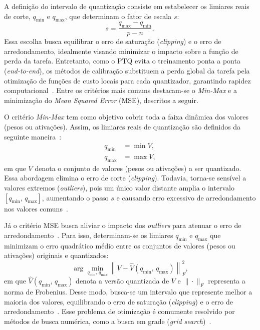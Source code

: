 A definição do intervalo de quantização consiste em estabelecer os limiares reais de corte, $q_{\min}$ e $q_{\max}$, que determinam o fator de escala $s$:
\begin{equation}
s = \frac{q_{\max} - q_{\min}}{p - n},
\label{eq:escala_s}
\end{equation}
Essa escolha busca equilibrar o erro de saturação (\textit{clipping}) e o erro de arredondamento, idealmente visando minimizar o impacto sobre a função de perda da tarefa. Entretanto, 
como o PTQ evita o treinamento ponta a ponta (\textit{end-to-end}), os métodos de calibração substituem a perda global da tarefa pela otimização de funções de custo locais para cada quantizador,      
garantindo rapidez computacional~\cite{nagel2021}. Entre os critérios mais comuns destacam-se o \textit{Min-Max} e a minimização do \textit{Mean Squared Error} (MSE), descritos a     
seguir.

O critério \textit{Min-Max} tem como objetivo cobrir toda a faixa dinâmica dos valores (pesos ou ativações). Assim, os limiares reais de quantização são definidos da seguinte         
maneira~\cite{nagel2021}:
\begin{align}
q_{\min} &= \min V, \label{eq:ptq_minmax_min} \\
q_{\max} &= \max V, \label{eq:ptq_minmax_max}
\end{align}
em que $V$ denota o conjunto de valores (pesos ou ativações) a ser quantizado. Essa abordagem elimina o erro de corte (\textit{clipping}). Todavia, torna-se sensível a valores        
extremos (\textit{outliers}), pois um único valor distante amplia o intervalo $[q_{\min},\, q_{\max}]$, aumentando o passo $s$ e causando erro excessivo de arredondamento nos valores 
comuns~\cite{nagel2021}.

Já o critério MSE busca aliviar o impacto dos \textit{outliers} para atenuar o erro de arredondamento~\cite{nagel2021}. Para isso, determinam-se os limiares $q_{\min}$ e $q_{\max}$
que minimizam o erro quadrático médio entre os conjuntos de valores (pesos ou ativações) originais e quantizados:                                                                      
\begin{equation}
\arg\min_{q_{\min},\, q_{\max}} \left\| V - \hat{V}(q_{\min},\, q_{\max}) \right\|_F^2,
\label{eq:ptq_mse}
\end{equation}    
em que $\hat{V}(q_{\min},\, q_{\max})$ denota a versão quantizada de $V$ e $\|\cdot\|_F$ representa a norma de Frobenius. Desse modo, busca-se um intervalo que represente melhor a
maioria dos valores, equilibrando o erro de saturação (\textit{clipping}) e o erro de arredondamento~\cite{nagel2021}. Esse problema de otimização é comumente resolvido por métodos de
busca numérica, como a busca em grade (\textit{grid search})~\cite{nagel2021}.

